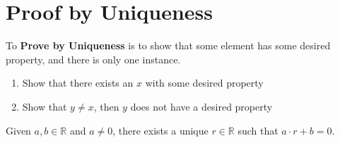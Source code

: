 \documentclass{report}
\begin{document}
    \section{\LARGE Proof by Uniqueness}
    \bigbreak \noindent 
    \smallbreak \noindent
    \begin{definition}
     To \textbf{Prove by Uniqueness} is to show that some element has some desired property, and there is only one instance.
     \begin{enumerate}
         \item Show that there exists an $x$ with some desired property
        \item Show that $y\ne x$, then $y $ does not have a desired property
     \end{enumerate}
    \end{definition}


    \bigbreak \noindent 
    \begin{prop}
Given $a, b \in \mathbb{R}$ and $a \ne 0$, there exists a unique $r \in \mathbb{R}$ such that $a \cdot r + b = 0$.
\end{prop}
\end{document}
